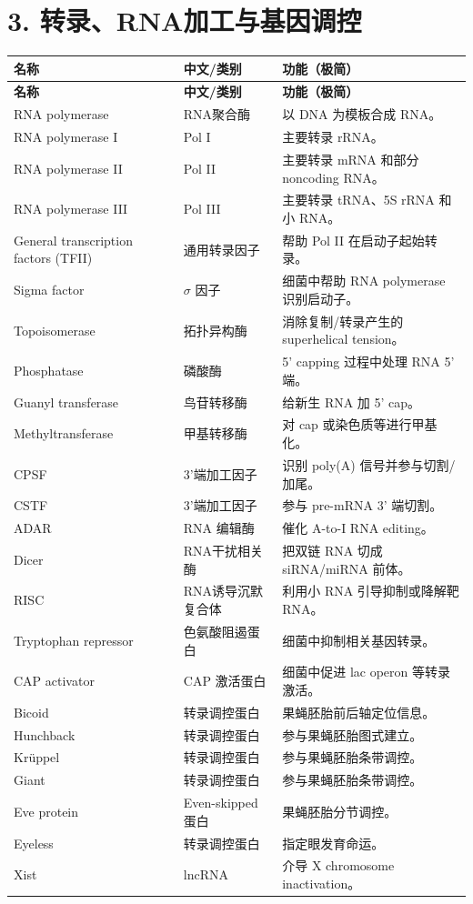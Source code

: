 \documentclass[11pt,fontset=none]{ctexart}
\begin{document}
\section*{3. 转录、RNA加工与基因调控}
\begin{longtable}{L{3.2cm} L{3.8cm} L{8.5cm}}
\toprule
\textbf{名称} & \textbf{中文/类别} & \textbf{功能（极简）} \\
\midrule
\endfirsthead
\toprule
\textbf{名称} & \textbf{中文/类别} & \textbf{功能（极简）} \\
\midrule
\endhead
\bottomrule
\endfoot
RNA polymerase & RNA聚合酶 & 以 DNA 为模板合成 RNA。 \\
RNA polymerase I & Pol I & 主要转录 rRNA。 \\
RNA polymerase II & Pol II & 主要转录 mRNA 和部分 noncoding RNA。 \\
RNA polymerase III & Pol III & 主要转录 tRNA、5S rRNA 和小 RNA。 \\
General transcription factors (TFII) & 通用转录因子 & 帮助 Pol II 在启动子起始转录。 \\
Sigma factor & $\sigma$ 因子 & 细菌中帮助 RNA polymerase 识别启动子。 \\
Topoisomerase & 拓扑异构酶 & 消除复制/转录产生的 superhelical tension。 \\
Phosphatase & 磷酸酶 & 5' capping 过程中处理 RNA 5' 端。 \\
Guanyl transferase & 鸟苷转移酶 & 给新生 RNA 加 5' cap。 \\
Methyltransferase & 甲基转移酶 & 对 cap 或染色质等进行甲基化。 \\
CPSF & 3'端加工因子 & 识别 poly(A) 信号并参与切割/加尾。 \\
CSTF & 3'端加工因子 & 参与 pre-mRNA 3' 端切割。 \\
ADAR & RNA 编辑酶 & 催化 A-to-I RNA editing。 \\
Dicer & RNA干扰相关酶 & 把双链 RNA 切成 siRNA/miRNA 前体。 \\
RISC & RNA诱导沉默复合体 & 利用小 RNA 引导抑制或降解靶 RNA。 \\
Tryptophan repressor & 色氨酸阻遏蛋白 & 细菌中抑制相关基因转录。 \\
CAP activator & CAP 激活蛋白 & 细菌中促进 lac operon 等转录激活。 \\
Bicoid & 转录调控蛋白 & 果蝇胚胎前后轴定位信息。 \\
Hunchback & 转录调控蛋白 & 参与果蝇胚胎图式建立。 \\
Kr\"uppel & 转录调控蛋白 & 参与果蝇胚胎条带调控。 \\
Giant & 转录调控蛋白 & 参与果蝇胚胎条带调控。 \\
Eve protein & Even-skipped 蛋白 & 果蝇胚胎分节调控。 \\
Eyeless & 转录调控蛋白 & 指定眼发育命运。 \\
Xist & lncRNA & 介导 X chromosome inactivation。 \\
\end{longtable}
\end{document}
